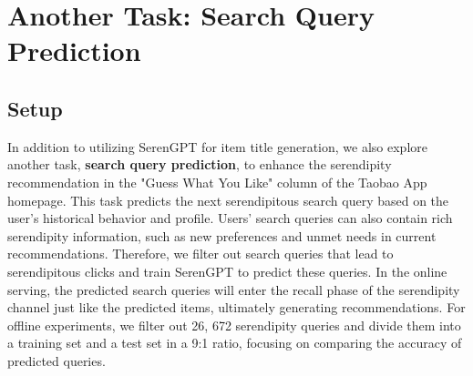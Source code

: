 

\section{Another Task: Search Query Prediction}
\subsection{Setup} In addition to utilizing SerenGPT for item title generation, we also explore another task, \textbf{search query prediction}, to enhance the serendipity recommendation in the "Guess What You Like" column of the Taobao App homepage. This task predicts the next serendipitous search query based on the user's historical behavior and profile. Users' search queries can also contain rich serendipity information, such as new preferences and unmet needs in current recommendations. Therefore, we filter out search queries that lead to serendipitous clicks and train SerenGPT to predict these queries. In the online serving, the predicted search queries will enter the recall phase of the serendipity channel just like the predicted items, ultimately generating recommendations. For offline experiments, we filter out 26, 672 serendipity queries and divide them into a training set and a test set in a 9:1 ratio, focusing on comparing the accuracy of predicted queries.


